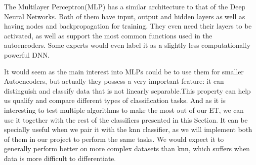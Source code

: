 The Multilayer Perceptron(MLP) has a similar architecture to that of the Deep Neural Networks. Both of them have input, output and hidden layers as well as having nodes and backpropagation for training. They even need their layers to be activated, as well as support the most common functions used in the autoencoders. Some experts would even label it as a slightly less computationally powerful DNN. \par

It would seem as the main interest into MLPs could be to use them for smaller Autoencoders, but actually they possess a very important feature: it can distinguish and classify data that is not linearly separable.This property can help us qualify and compare different types of classification tasks. And as it is interesting to test multiple algorithms to make the most out of our ET, we can use it together with the rest of the classifiers presented in this Section. It can be specially useful when we pair it with the knn classifier, as we will implement both of them in our project to perform the same tasks. We would expect it to generally perform better on more complex datasets than knn, which suffers when data is more difficult to differentiate. \par

